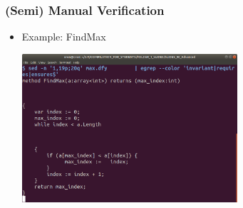 
\begin{frame}

\frametitle{(Semi) Manual Verification}

\begin{itemize}

\item Example: FindMax
\begin{center}
\includegraphics[width=8cm]{FOLDER_3_IMG_FILES/Code_02_max.png}
\end{center}

\end{itemize}

\end{frame}

